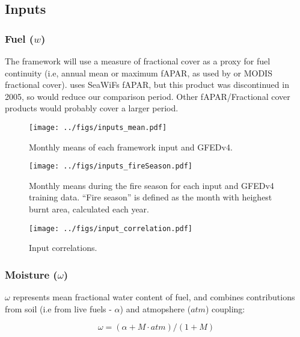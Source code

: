 
\subsection{Inputs}

\begin{shaded}
\subsubsection{Fuel ($w$)}
The framework will use a measure of fractional cover as a proxy for fuel continuity (i.e, annual mean or maximum fAPAR, as used by \citet{knorr2014impact,knorr2016climate} or MODIS fractional cover). \citet{bistinas2014causal} uses SeaWiFs fAPAR, but this product was discontinued in 2005, so would reduce our comparison period. Other fAPAR/Fractional cover products would probably cover a larger period.
\end{shaded}

\begin{figure}[!ht]
  \centering
    \texttt{[image: ../figs/inputs\_mean.pdf]}
  \caption{Monthly means of each framework input  and GFEDv4.}
  \label{fig:Monthly_mean_ins}
\end{figure}

\begin{figure}[!ht]
  \centering
    \texttt{[image: ../figs/inputs\_fireSeason.pdf]}
  \caption{Monthly means during the fire season for each input  and GFEDv4 training data. ``Fire season'' is defined as the month with heighest burnt area, calculated each year.}
  \label{fig:Season_mean_ins}
\end{figure}

\begin{figure}[!ht]
  \centering
    \texttt{[image: ../figs/input\_correlation.pdf]}
  \caption{Input correlations.}
  \label{fig:Corr_ins}
\end{figure}

\subsubsection{Moisture ($\omega$)}

$\omega$ represents mean fractional water content of fuel, and combines contributions from soil (i.e from live fuels - $\alpha$) and atmopshere ($atm$) coupling:

\begin{equation}
    \omega = (\alpha + M \cdot atm) / (1 + M)
\end{equation}

